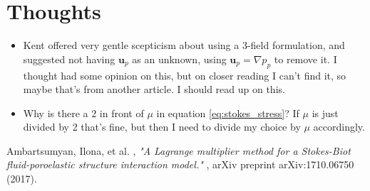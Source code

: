\documentclass{article}
\newcommand{\mathspace}[1]{\ensuremath{#1}\xspace} %
\newcommand{\grad}{\mathspace{\nabla}}
\newcommand{\up}{\mathspace{\mathbf{u}_p}}
\newcommand{\pp}{\mathspace{p_p}}
\begin{document}
\section{Thoughts}
\begin{itemize}
\item Kent offered very gentle scepticism about using a 3-field formulation, and suggested not having \up as an unknown, using $\up = \grad \pp$ to remove it. I thought \cite{ambartsumyan} had some opinion on this, but on closer reading I can't find it, so maybe that's from another article. I should read up on this.

\item Why is there a 2 in front of $\mu$ in equation \eqref{eq:stokes_stress}? If $\mu$ is just divided by 2 that's fine, but then I need to divide my choice by $\mu$ accordingly.

   
 
\end{itemize}



\begin{thebibliography}{99}
{\sc Ambartsumyan, Ilona, et al. }, {\em "A Lagrange multiplier method for a Stokes-Biot fluid-poroelastic structure interaction model." }, arXiv preprint arXiv:1710.06750 (2017).
  
\end{thebibliography}
\end{document}
